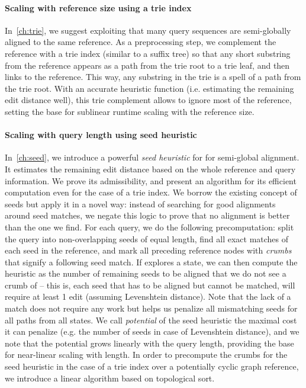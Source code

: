 \paragraph{Scaling with reference size using a trie index}
In~\cref{ch:trie}, we suggest exploiting that many query sequences are
semi-globally aligned to the same reference. As a preprocessing step, we
complement the reference with a trie index (similar to a suffix tree) so that
any short substring from the reference appears as a path from the trie root to a
trie leaf, and then links to the reference. This way, any substring in the trie
is a spell of a path from the trie root. With an accurate heuristic function
(i.e. estimating the remaining edit distance well), this trie complement allows
to ignore most of the reference, setting the base for sublinear runtime scaling
with the reference size.

\paragraph{Scaling with query length using seed heuristic}
In~\cref{ch:seed}, we introduce a powerful \emph{seed heuristic} for \A for
semi-global alignment. It estimates the remaining edit distance based on the
whole reference and query information. We prove its admissibility, and present
an algorithm for its efficient computation even for the case of a trie index. We
borrow the existing concept of seeds but apply it in a novel way: instead of
searching for good alignments around seed matches, we negate this logic to prove
that no alignment is better than the one we find. For each query, we do the
following precomputation: split the query into non-overlapping seeds of equal
length, find all exact matches of each seed in the reference, and mark all
preceding reference nodes with \emph{crumbs} that signify a following seed
match. If \A explores a state, we can then compute the heuristic as the number
of remaining seeds to be aligned that we do not see a crumb of -- this is, each
seed that has to be aligned but cannot be matched, will require at least 1 edit
(assuming Levenshtein distance). Note that the lack of a match does not require
any work but helps us penalize all mismatching seeds for all paths from all
states. We call \emph{potential} of the seed heuristic the maximal cost it can
penalize (e.g. the number of seeds in case of Levenshtein distance), and we note
that the potential grows linearly with the query length, providing the base for
near-linear scaling with length. In order to precompute the crumbs for the seed
heuristic in the case of a trie index over a potentially cyclic graph reference,
we introduce a linear algorithm based on topological sort.

